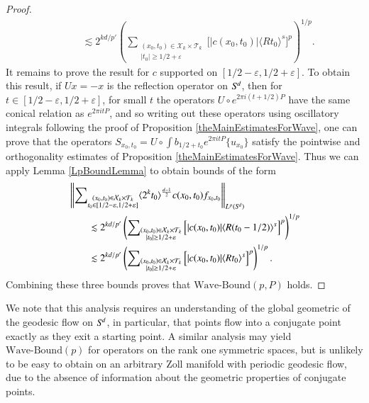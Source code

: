 \begin{proof}
\begin{equation}
\begin{split}
        &\quad\quad \lesssim 2^{kd/p'} \left( \sum\nolimits_{\substack{(x_0,t_0) \in \mathcal{X}_k \times \mathcal{T}_k\\|t_0| \geq 1/2 + \varepsilon}} \Big[ |c(x_0,t_0)| \langle R t_0 \rangle^{s} \Big]^p \right)^{1/p}.
    \end{split}
    \end{equation}
    It remains to prove the result for $c$ supported on $[1/2 - \varepsilon, 1/2 + \varepsilon]$. To obtain this result, if $Ux = -x$ is the reflection operator on ${S}^{\!{d}}$, then for $t \in [1/2 - \varepsilon, 1/2 + \varepsilon]$, for small $t$ the operators $U \circ e^{2 \pi i (t + 1/2) P}$ have the same conical relation as $e^{2 \pi i t P}$, and so writing out these operators using oscillatory integrals following the proof of Proposition \ref{theMainEstimatesForWave}, one can prove that the operators $S\!_{x_0,t_0} = U \circ \int b_{1/2 + t_0} e^{2 \pi i t P} \{ u_{x_0} \}$ satisfy the pointwise and orthogonality estimates of Proposition \ref{theMainEstimatesForWave}. Thus we can apply Lemma \ref{LpBoundLemma} to obtain bounds of the form
    \begin{equation}
    \begin{split}
        &\left\| \sum\nolimits_{\substack{(x_0,t_0) \in \mathcal{X}_k \times \mathcal{T}_k\\t_0 \in [1/2 - \varepsilon, 1/2 + \varepsilon]}} \langle 2^k t_0 \rangle^{\frac{d-1}{2}} c(x_0,t_0) f_{x_0,t_0} \right\|_{L^p({S}^{\!{d}})} \\
        &\quad\quad \lesssim 2^{kd/p'} \left( \sum\nolimits_{\substack{(x_0,t_0) \in \mathcal{X}_k \times \mathcal{T}_k\\|t_0| \geq 1/2 + \varepsilon}} \Big[ |c(x_0,t_0)| \langle R (t_0 - 1/2) \rangle^{s} \Big]^p \right)^{1/p}\\
        &\quad\quad \lesssim 2^{kd/p'} \left( \sum\nolimits_{\substack{(x_0,t_0) \in \mathcal{X}_k \times \mathcal{T}_k\\|t_0| \geq 1/2 + \varepsilon}} \Big[ |c(x_0,t_0)| \langle R t_0 \rangle^{s} \Big]^p \right)^{1/p}.
    \end{split}
    \end{equation}
    Combining these three bounds proves that $\text{Wave-Bound}(p,P)$ holds.
\end{proof}

\begin{remark}
    We note that this analysis requires an understanding of the global geometric of the geodesic flow on ${S}^{\!{d}}$, in particular, that points flow into a conjugate point exactly as they exit a starting point. A similar analysis may yield $\text{Wave-Bound}(p)$ for operators on the rank one symmetric spaces, but is unlikely to be easy to obtain on an arbitrary Zoll manifold with periodic geodesic flow, due to the absence of information about the geometric properties of conjugate points.
\end{remark}

